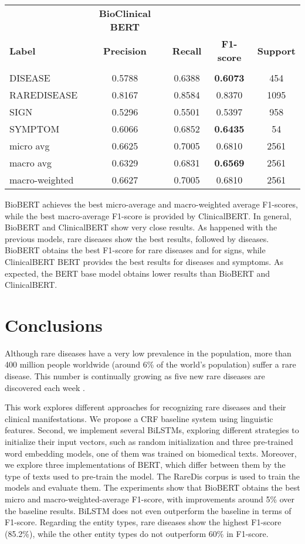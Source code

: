\documentclass[preprint,12pt]{elsarticle}
\begin{document}
\begin{table}[!htbp]
\begin{tabular}{lcccc}
\hline

& \multicolumn{1}{c}{\textbf{BioClinical BERT}} \\
{\bf Label} & {\bf Precision} &
{\bf Recall} &
{\bf F1-score} & {\bf Support} \\
\hline\\[-8pt]
DISEASE & 0.5788 & 0.6388 & \bf 0.6073 &   454\\
RAREDISEASE & 0.8167 & 0.8584 & 0.8370 &  1095\\
SIGN & 0.5296 & 0.5501 & 0.5397 &   958\\
SYMPTOM & 0.6066 & 0.6852 & \bf 0.6435 &54\\

micro avg & 0.6625 & 0.7005 & 0.6810 &  2561\\
macro avg & 0.6329 & 0.6831 & \bf 0.6569 &  2561\\

macro-weighted & 0.6627 & 0.7005 & 0.6810 &  2561\\

\hline
\end{tabular}
\end{table}


BioBERT achieves the best micro-average and macro-weighted average F1-scores, while the best macro-average F1-score is provided by ClinicalBERT. In general, BioBERT and ClinicalBERT show very close results. As happened with the previous models, rare diseases show the best results, followed by diseases.
BioBERT obtains the best F1-score for rare diseases and for signs, while ClinicalBERT BERT provides the best results for diseases and symptoms. As expected, the BERT base model obtains lower results than BioBERT and ClinicalBERT.  



\section{Conclusions}
\label{sec:conclu}
Although rare diseases have a very low prevalence in the population, more than 400 million people worldwide (around 6\% of the world's population) suffer a rare disease. This number is continually growing as five new rare diseases are discovered each week  \citep{maria2010rare}. 

This work explores different approaches for recognizing rare diseases and their clinical manifestations. We propose a CRF baseline system using linguistic features. Second, we implement several BiLSTMs, exploring different strategies to initialize their input vectors, such as random initialization and three pre-trained word embedding models, one of them was trained on biomedical texts. Moreover, we explore three implementations of BERT, which differ between them by the type of texts used to pre-train the model. The RareDis corpus is used to train the models and evaluate them. The experiments show that BioBERT obtains the best micro and macro-weighted-average F1-score, with  improvements around 5\% over the baseline results. BiLSTM does not even outperform the baseline in terms of F1-score. 
Regarding the entity types, rare diseases show the highest F1-score (85.2\%), while the other entity types do not outperform 60\% in F1-score.
\end{document}
